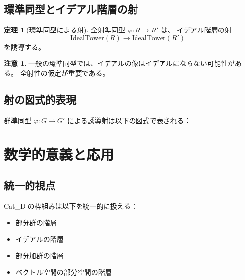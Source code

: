 \documentclass[a4paper,12pt]{ltjsarticle}
\theoremstyle{definition}
\newtheorem{theorem}[definition]{定理}
\newtheorem{remark}[definition]{注意}
\begin{document}
\subsection{環準同型とイデアル階層の射}

\begin{theorem}[環準同型による射]
全射準同型 $\varphi : R \to R'$ は、
イデアル階層の射
\[
\text{IdealTower}(R) \to \text{IdealTower}(R')
\]
を誘導する。
\end{theorem}

\begin{remark}
一般の環準同型では、イデアルの像はイデアルにならない可能性がある。
全射性の仮定が重要である。
\end{remark}

\subsection{射の図式的表現}

群準同型 $\varphi : G \to G'$ による誘導射は以下の図式で表される：

\begin{center}
\end{center}

\section{数学的意義と応用}

\subsection{統一的視点}

Cat\_D の枠組みは以下を統一的に扱える：
\begin{itemize}
  \item 部分群の階層
  \item イデアルの階層
  \item 部分加群の階層
  \item ベクトル空間の部分空間の階層
\end{itemize}
\end{document}
